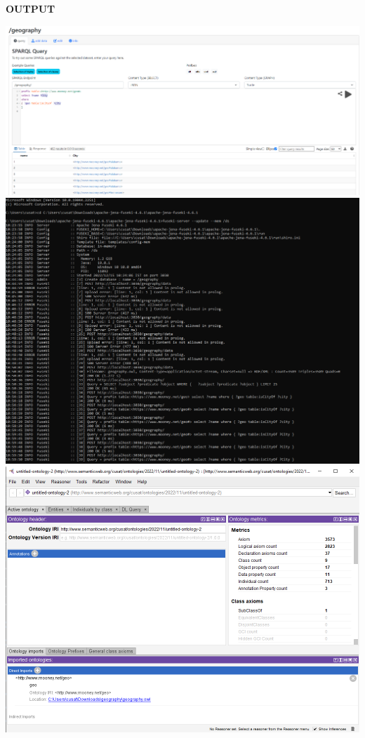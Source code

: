 \documentclass[a4paper,12pt]{report}
\begin{document}
\begin{flushleft}
    \textbf{OUTPUT}
\end{flushleft}
\includegraphics[scale=0.4]{Screenshot 2022-12-15 161337.png}
\includegraphics[scale=0.4]{Screenshot 2022-12-15 161407.png}
\includegraphics[scale=0.4]{Screenshot 2022-12-15 161435.png}
\end{document}
